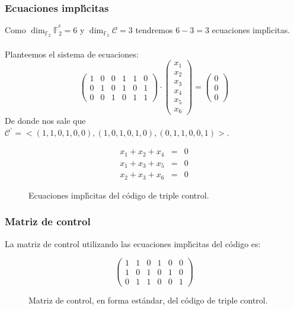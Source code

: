 \subsubsection{Ecuaciones impl\'{\i}citas}

Como $\dim_{\mathbb{F}_2} \mathbb{F}^{^6}_2 = 6$ y
$\dim_{\mathbb{F}_2} \mathcal{C} = 3$ tendremos $6-3=3$ ecuaciones
impl\'{\i}citas.\\ \\
%
Planteemos el sistema de ecuaciones:
\begin{displaymath}
\left( \begin{array}{cccccc}
1&0&0&1&1&0 \\
0&1&0&1&0&1 \\
0&0&1&0&1&1
\end{array} \right) \cdot
\left( \begin{array}{c}
x_1 \\
x_2 \\
x_3 \\
x_4 \\
x_5 \\
x_6
\end{array} \right) =
\left( \begin{array}{c}
0 \\
0 \\
0
\end{array} \right)
\end{displaymath}
De donde nos sale que $\mathcal{C}^{^\circ}=<(1,1,0,1,0,0),(1,0,1,0,1,0),
(0,1,1,0,0,1)>$.
\begin{figure}[!h]
\begin{eqnarray*}
x_1+x_2+x_4&=&0\\
x_1+x_3+x_5&=&0\\
x_2+x_3+x_6&=&0
\end{eqnarray*}
\caption{Ecuaciones impl\'{\i}citas del c\'odigo de triple control.}
\end{figure}
%
\newpage
%
\subsubsection{Matriz de control}

La matriz de control utilizando las ecuaciones impl\'{\i}citas del c\'odigo
es:
\begin{figure}[!h]
\begin{displaymath}
\left( \begin{array}{cccccc}
1&1&0&1&0&0\\
1&0&1&0&1&0\\
0&1&1&0&0&1
\end{array} \right)
\end{displaymath}
\caption{Matriz de control, en forma est\'andar, del c\'odigo de triple
control.}
\end{figure}
